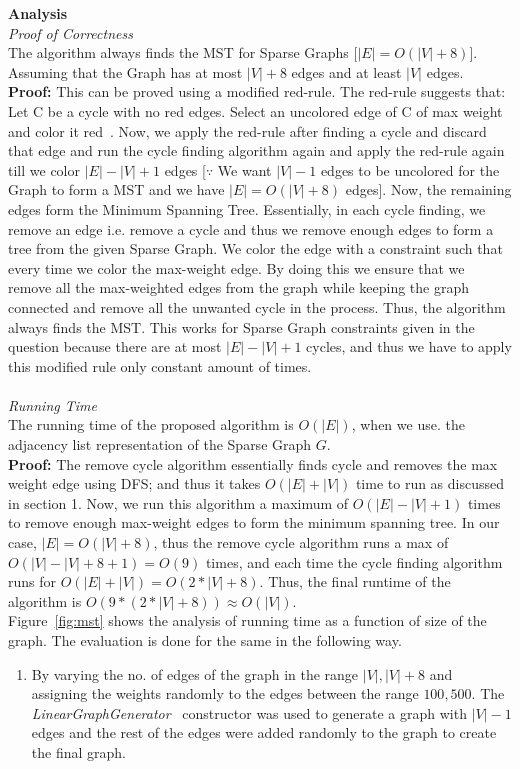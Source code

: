 \documentclass{article}
\begin{document}
\textbf{Analysis}\\
\textit{Proof of Correctness}\\
The algorithm always finds the MST for Sparse Graphs [$|E| = O(|V|+8)$].
Assuming that the Graph has at most $|V|+8$ edges and at least $|V|$ edges.\\
\textbf{Proof:} This can be proved using a modified red-rule. The red-rule suggests that: Let C be a cycle with no red edges. Select an uncolored
edge of C of max weight and color it red~\cite{tarjan1983data}.
Now, we apply the red-rule after finding a cycle and discard that edge and run the cycle finding algorithm again and apply the red-rule again till we color $|E|-|V|+1$ edges  [$\because$ We want $|V|-1$ edges to be uncolored for the Graph to form a MST and we have $|E|=O(|V|+8)$ edges]. Now, the remaining edges form the Minimum Spanning Tree. Essentially, in each cycle finding, we remove an edge i.e. remove a cycle and thus we remove enough edges to form a tree from the given Sparse Graph. We color the edge with a constraint such that every time we color the max-weight edge. By doing this we ensure that we remove all the max-weighted edges from the graph while keeping the graph connected and remove all the unwanted cycle in the process. Thus, the algorithm always finds the MST. This works for Sparse Graph constraints given in the question because there are at most $|E|-|V|+1$ cycles, and thus we have to apply this modified rule only constant amount of times.\\\\
\textit{Running Time}\\
The running time of the proposed algorithm is $O(|E|)$, when we use. the adjacency list representation of the Sparse Graph $G$.\\
\textbf{Proof:} The remove cycle algorithm essentially finds cycle and removes the max weight edge using DFS; and thus it takes $O(|E|+|V|)$ time to run as discussed in section 1. Now, we run this algorithm a maximum of $O(|E|-|V|+1)$ times to remove enough max-weight edges to form the minimum spanning tree. In our case, $|E| = O(|V|+8)$, thus the remove cycle algorithm runs a max of $O(|V|-|V|+8+1) = O(9)$ times, and each time the cycle finding algorithm runs for $O(|E|+|V|) = O(2*|V|+8)$. Thus, the final runtime of the algorithm is $O(9*(2*|V|+8)) \approx O(|V|)$. \\
Figure~\ref{fig:mst} shows the analysis of running time as a function of size of the graph. The evaluation is done for the same in the following way. 
\begin{enumerate}
    \item By varying the no. of edges of the graph in the range ${|V|,|V|+8}$ and assigning the weights randomly to the edges between the range ${100, 500}$. The \textit{LinearGraphGenerator}~\cite{10.1145/3381449, kim2003generating} constructor was used to generate a graph with $|V|-1$ edges and the rest of the edges were added randomly to the graph to create the final graph.
\end{enumerate}
\end{document}
